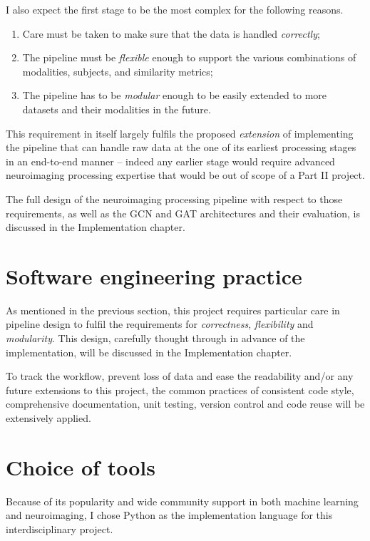 I also expect the first stage to be the most complex for the following reasons.
\begin{enumerate}
    \item Care must be taken to make sure that the data is handled \textit{correctly};
    \item The pipeline must be \textit{flexible} enough to support the various combinations of modalities, subjects, and similarity metrics;
    \item The pipeline has to be \textit{modular} enough to be easily extended to more datasets and their modalities in the future.
\end{enumerate} 

This requirement in itself largely fulfils the proposed \textit{extension} of implementing the pipeline that can handle raw data at the one of its earliest processing stages in an end-to-end manner – indeed any earlier stage would require advanced neuroimaging processing expertise that would be out of scope of a Part II project. 

The full design of the neuroimaging processing pipeline with respect to those requirements, as well as the GCN and GAT architectures and their evaluation, is discussed in the Implementation chapter.

\section{Software engineering practice}

As mentioned in the previous section, this project requires particular care in pipeline design to fulfil the requirements for \textit{correctness}, \textit{flexibility} and \textit{modularity}. This design, carefully thought through in advance of the implementation, will be discussed in the Implementation chapter.

To track the workflow, prevent loss of data and ease the readability and/or any future extensions to this project, the common practices of consistent code style, comprehensive documentation, unit testing, version control and code reuse will be extensively applied.

\section{Choice of tools}

Because of its popularity and wide community support in both machine learning and neuroimaging, I chose Python as the implementation language for this interdisciplinary project.

